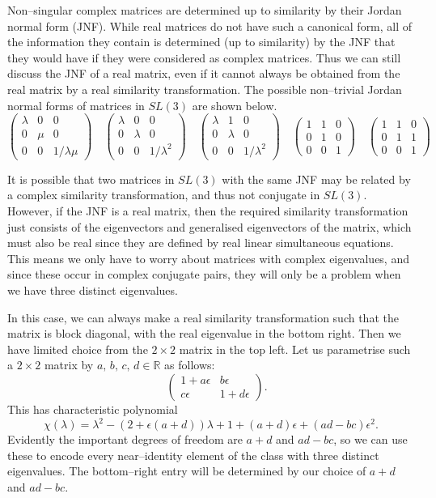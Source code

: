 Non--singular complex matrices are determined up to similarity by their Jordan normal form (JNF). While real matrices do not have such a canonical form, all of the information they contain is determined (up to similarity) by the JNF that they would have if they were considered as complex matrices. Thus we can still discuss the JNF of a real matrix, even if it cannot always be obtained from the real matrix by a real similarity transformation. The possible non--trivial Jordan normal forms of matrices in $SL(3)$ are shown below.
\[
\begin{pmatrix}\lambda & 0 & 0\\
0 & \mu & 0\\
0 & 0 & 1/\lambda\mu
\end{pmatrix}
\quad
\begin{pmatrix}\lambda & 0 & 0\\
0 & \lambda & 0\\
0 & 0 & 1/\lambda^2
\end{pmatrix}
\quad
\begin{pmatrix}\lambda & 1 & 0\\
0 & \lambda & 0\\
0 & 0 & 1/\lambda^2
\end{pmatrix}
\quad
\begin{pmatrix}1 & 1 & 0\\
0 & 1 & 0\\
0 & 0 & 1
\end{pmatrix}
\quad
\begin{pmatrix}1 & 1 & 0\\
0 & 1 & 1\\
0 & 0 & 1
\end{pmatrix}
\]

It is possible that two matrices in $SL(3)$ with the same JNF may be related by a complex similarity transformation, and thus not conjugate in $SL(3)$. However, if the JNF is a real matrix, then the required similarity transformation just consists of the eigenvectors and generalised eigenvectors of the matrix, which must also be real since they are defined by real linear simultaneous equations. This means we only have to worry about matrices with complex eigenvalues, and since these occur in complex conjugate pairs, they will only be a problem when we have three distinct eigenvalues.

In this case, we can always make a real similarity transformation such that the matrix is block diagonal, with the real eigenvalue in the bottom right. Then we have limited choice from the $2\times 2$ matrix in the top left. Let us parametrise such a $2\times 2$ matrix by $a,\,b,\,c,\,d\in\mathbb{R}$ as follows:
\[
\quad
\begin{pmatrix}1+a\epsilon & b\epsilon \\
c\epsilon & 1+d\epsilon 
\end{pmatrix}.
\]
This has characteristic polynomial
\[
\chi(\lambda)=\lambda^2-(2+\epsilon(a+d))\lambda+1+(a+d)\epsilon+(ad-bc)\epsilon^2.
\]
Evidently the important degrees of freedom are $a+d$ and $ad-bc$, so we can use these to encode every near--identity element of the class with three distinct eigenvalues. The bottom--right entry will be determined by our choice of $a+d$ and $ad-bc$.

